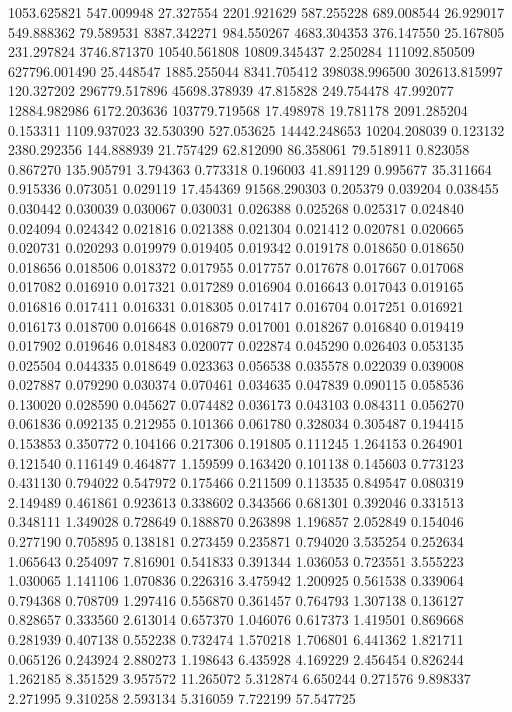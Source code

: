 1053.625821
547.009948
27.327554
2201.921629
587.255228
689.008544
26.929017
549.888362
79.589531
8387.342271
984.550267
4683.304353
376.147550
25.167805
231.297824
3746.871370
10540.561808
10809.345437
2.250284
111092.850509
627796.001490
25.448547
1885.255044
8341.705412
398038.996500
302613.815997
120.327202
296779.517896
45698.378939
47.815828
249.754478
47.992077
12884.982986
6172.203636
103779.719568
17.498978
19.781178
2091.285204
0.153311
1109.937023
32.530390
527.053625
14442.248653
10204.208039
0.123132
2380.292356
144.888939
21.757429
62.812090
86.358061
79.518911
0.823058
0.867270
135.905791
3.794363
0.773318
0.196003
41.891129
0.995677
35.311664
0.915336
0.073051
0.029119
17.454369
91568.290303
0.205379
0.039204
0.038455
0.030442
0.030039
0.030067
0.030031
0.026388
0.025268
0.025317
0.024840
0.024094
0.024342
0.021816
0.021388
0.021304
0.021412
0.020781
0.020665
0.020731
0.020293
0.019979
0.019405
0.019342
0.019178
0.018650
0.018650
0.018656
0.018506
0.018372
0.017955
0.017757
0.017678
0.017667
0.017068
0.017082
0.016910
0.017321
0.017289
0.016904
0.016643
0.017043
0.019165
0.016816
0.017411
0.016331
0.018305
0.017417
0.016704
0.017251
0.016921
0.016173
0.018700
0.016648
0.016879
0.017001
0.018267
0.016840
0.019419
0.017902
0.019646
0.018483
0.020077
0.022874
0.045290
0.026403
0.053135
0.025504
0.044335
0.018649
0.023363
0.056538
0.035578
0.022039
0.039008
0.027887
0.079290
0.030374
0.070461
0.034635
0.047839
0.090115
0.058536
0.130020
0.028590
0.045627
0.074482
0.036173
0.043103
0.084311
0.056270
0.061836
0.092135
0.212955
0.101366
0.061780
0.328034
0.305487
0.194415
0.153853
0.350772
0.104166
0.217306
0.191805
0.111245
1.264153
0.264901
0.121540
0.116149
0.464877
1.159599
0.163420
0.101138
0.145603
0.773123
0.431130
0.794022
0.547972
0.175466
0.211509
0.113535
0.849547
0.080319
2.149489
0.461861
0.923613
0.338602
0.343566
0.681301
0.392046
0.331513
0.348111
1.349028
0.728649
0.188870
0.263898
1.196857
2.052849
0.154046
0.277190
0.705895
0.138181
0.273459
0.235871
0.794020
3.535254
0.252634
1.065643
0.254097
7.816901
0.541833
0.391344
1.036053
0.723551
3.555223
1.030065
1.141106
1.070836
0.226316
3.475942
1.200925
0.561538
0.339064
0.794368
0.708709
1.297416
0.556870
0.361457
0.764793
1.307138
0.136127
0.828657
0.333560
2.613014
0.657370
1.046076
0.617373
1.419501
0.869668
0.281939
0.407138
0.552238
0.732474
1.570218
1.706801
6.441362
1.821711
0.065126
0.243924
2.880273
1.198643
6.435928
4.169229
2.456454
0.826244
1.262185
8.351529
3.957572
11.265072
5.312874
6.650244
0.271576
9.898337
2.271995
9.310258
2.593134
5.316059
7.722199
57.547725
